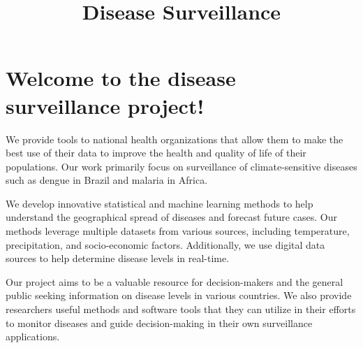 \documentclass[
  letterpaper,
  DIV=11,
  numbers=noendperiod]{scrreprt}
\title{Disease Surveillance}
\author{}
\date{}
\renewcommand*\contentsname{Table of contents}
\newcommand\contentsname{Table of contents}
\begin{document}
\maketitle
\ifdefined\Shaded\renewenvironment{Shaded}{\begin{tcolorbox}[sharp corners, interior hidden, breakable, frame hidden, boxrule=0pt, enhanced, borderline west={3pt}{0pt}{shadecolor}]}{\end{tcolorbox}}\fi

\renewcommand*\contentsname{Table of contents}
{
\hypersetup{linkcolor=}
\setcounter{tocdepth}{2}
\tableofcontents
}

\hypertarget{welcome-to-the-disease-surveillance-project}{%
\chapter*{Welcome to the disease surveillance
project!}\label{welcome-to-the-disease-surveillance-project}}


We provide tools to national health organizations that allow them to
make the best use of their data to improve the health and quality of
life of their populations. Our work primarily focus on surveillance of
climate-sensitive diseases such as dengue in Brazil and malaria in
Africa.

We develop innovative statistical and machine learning methods to help
understand the geographical spread of diseases and forecast future
cases. Our methods leverage multiple datasets from various sources,
including temperature, precipitation, and socio-economic factors.
Additionally, we use digital data sources to help determine disease
levels in real-time.

Our project aims to be a valuable resource for decision-makers and the
general public seeking information on disease levels in various
countries. We also provide researchers useful methods and software tools
that they can utilize in their efforts to monitor diseases and guide
decision-making in their own surveillance applications.
\end{document}
